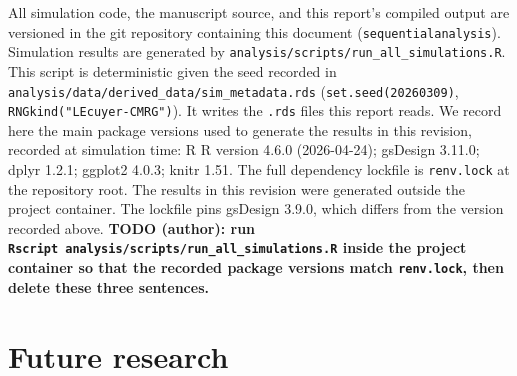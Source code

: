 \documentclass[
  11pt,
]{article}
\begin{document}
All simulation code, the manuscript source, and this
report's compiled output are versioned in the git
repository containing this document
(\texttt{sequentialanalysis}). Simulation results are
generated by \texttt{analysis/scripts/run\_all\_simulations.R}.
This script is deterministic given the seed recorded in
\texttt{analysis/data/derived\_data/sim\_metadata.rds}
(\texttt{set.seed(20260309)}, \texttt{RNGkind("L\textquotesingle{}Ecuyer-CMRG")}). It
writes the \texttt{.rds} files this report reads. We record
here the main package versions used to generate the
results in this revision, recorded at simulation
time: R
R version 4.6.0 (2026-04-24); gsDesign
3.11.0; dplyr
1.2.1; ggplot2
4.0.3; knitr
1.51. The full
dependency lockfile is \texttt{renv.lock} at the repository
root. The results in this revision were generated
outside the project container. The lockfile pins
gsDesign 3.9.0, which differs from the version recorded
above. \textbf{TODO (author): run
\texttt{Rscript\ analysis/scripts/run\_all\_simulations.R} inside
the project container so that the recorded package
versions match \texttt{renv.lock}, then delete these three
sentences.}

\section{Future research}\label{future-research}
\end{document}
